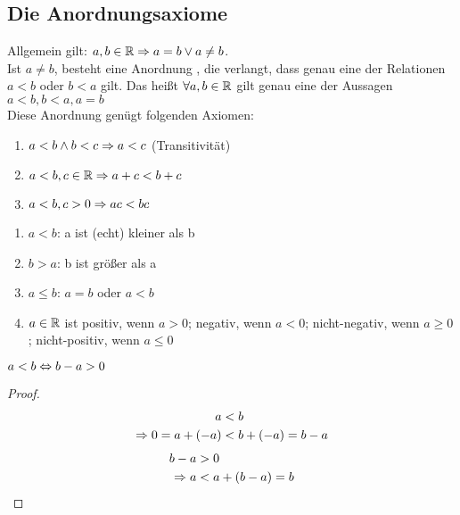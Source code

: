 \subsection{Die Anordnungsaxiome}

Allgemein gilt: $a,b\in\mathbb{R} \Rightarrow{} a = b \lor a \neq b$.\\
Ist $a\neq b$, besteht eine Anordnung \anf{$<$}, die verlangt, dass genau eine der Relationen $a<b$ oder $b<a$ gilt.
Das heißt $\forall a,b\in\mathbb{R}$ gilt genau eine der Aussagen $a<b, b<a, a= b$\\
Diese Anordnung genügt folgenden Axiomen:
\begin{axiom}[Anordnungsaxiome]
    \theoremescape
    \begin{enumerate}[label=(II.\arabic*)]
        \item $a<b \land b < c \Rightarrow{} a < c$ (Transitivität)
        \item $a<b, c \in\mathbb{R} \Rightarrow{} a + c < b + c$
        \item $a<b, c > 0 \Rightarrow{} ac < bc$
    \end{enumerate}
\end{axiom}

\begin{notation}
    \theoremescape
    \begin{enumerate}[label=-]
        \item $a < b$: a ist (echt) kleiner als b
        \item $b > a$: b ist größer als a
        \item $a\leq b$: $a=b$ oder $a < b$
        \item $a\in\mathbb{R}$ ist positiv, wenn $a>0$; negativ, wenn $a <0$; nicht-negativ, wenn $a\geq 0$; nicht-positiv, wenn $a\leq 0$
    \end{enumerate}
\end{notation}

\begin{beispiel}
    $a<b\Leftrightarrow{} b - a > 0$
    \begin{proof}
        \begin{align*}
            a &<b\\
            \Rightarrow{} 0 = a + \left(-a\right) &< b + \left(-a\right) = b - a\\
        \end{align*}
        \begin{align*}
            b-a &>0\\
            \Rightarrow{} a &< a + \left(b-a\right) = b\qedhere
        \end{align*}
    \end{proof}
\end{beispiel}

